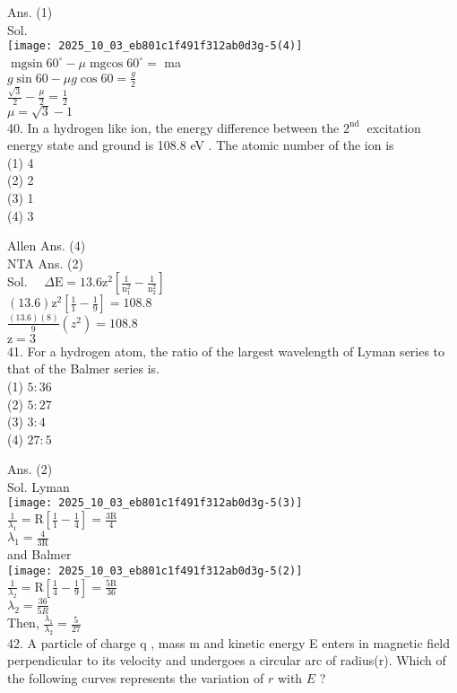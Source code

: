 \documentclass[10pt]{article}
\begin{document}
Ans. (1)\\
Sol.\\
\texttt{[image: 2025\_10\_03\_eb801c1f491f312ab0d3g-5(4)]}\\
\(\operatorname{mgsin} 60^{\circ}-\mu \operatorname{mgcos} 60^{\circ}=\) ma\\
\(g \sin 60-\mu g \cos 60=\frac{g}{2}\)\\
\(\frac{\sqrt{3}}{2}-\frac{\mu}{2}=\frac{1}{2}\)\\
\(\mu=\sqrt{3}-1\)\\
40. In a hydrogen like ion, the energy difference between the \(2^{\text {nd }}\) excitation energy state and ground is 108.8 eV . The atomic number of the ion is\\
(1) 4\\
(2) 2\\
(3) 1\\
(4) 3

Allen Ans. (4)\\
NTA Ans. (2)\\
Sol. \(\quad \Delta \mathrm{E}=13.6 \mathrm{z}^{2}\left[\frac{1}{\mathrm{n}_{1}^{2}}-\frac{1}{\mathrm{n}_{2}^{2}}\right]\)\\
\((13.6) \mathrm{z}^{2}\left[\frac{1}{1}-\frac{1}{9}\right]=108.8\)\\
\(\frac{(13.6)(8)}{9}\left(z^{2}\right)=108.8\)\\
\(\mathrm{z}=3\)\\
41. For a hydrogen atom, the ratio of the largest wavelength of Lyman series to that of the Balmer series is.\\
(1) \(5: 36\)\\
(2) \(5: 27\)\\
(3) \(3: 4\)\\
(4) \(27: 5\)

Ans. (2)\\
Sol. Lyman\\
\texttt{[image: 2025\_10\_03\_eb801c1f491f312ab0d3g-5(3)]}\\
\(\frac{1}{\lambda_{1}}=\mathrm{R}\left[\frac{1}{1}-\frac{1}{4}\right]=\frac{3 \mathrm{R}}{4}\)\\
\(\lambda_{1}=\frac{4}{3 \mathrm{R}}\)\\
and Balmer\\
\texttt{[image: 2025\_10\_03\_eb801c1f491f312ab0d3g-5(2)]}\\
\(\frac{1}{\lambda_{2}}=\mathrm{R}\left[\frac{1}{4}-\frac{1}{9}\right]=\frac{5 \mathrm{R}}{36}\)\\
\(\lambda_{2}=\frac{36}{5 R}\)\\
Then, \(\frac{\lambda_{1}}{\lambda_{2}}=\frac{5}{27}\)\\
42. A particle of charge q , mass m and kinetic energy E enters in magnetic field perpendicular to its velocity and undergoes a circular arc of radius(r). Which of the following curves represents the variation of \(r\) with \(E\) ?
\end{document}
